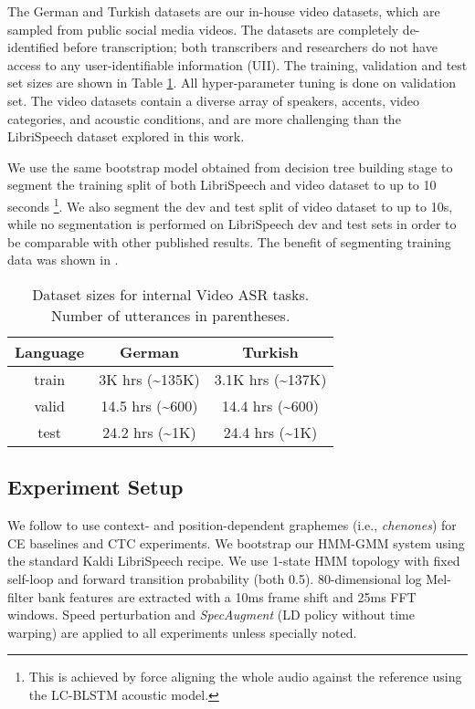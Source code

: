\documentclass[a4paper]{article}
\begin{document}
The German and Turkish datasets are our in-house video datasets, which are sampled from public social media videos. The datasets are completely de-identified before transcription; both transcribers and researchers do not have access to any user-identifiable information (UII). The training, validation and test set sizes are shown in Table \ref{tab:video_data}. All hyper-parameter tuning is done on validation set. The video datasets contain a diverse array of speakers, accents, video categories, and acoustic conditions, and are more challenging than the LibriSpeech dataset explored in this work.



We use the same bootstrap model obtained from decision tree building stage to segment the training split of both LibriSpeech and video dataset to up to 10 seconds \footnote{
This is achieved by force aligning the whole audio against the reference using the LC-BLSTM acoustic model. }. We also segment the dev and test split of video dataset to up to 10s, while no segmentation is performed on LibriSpeech dev and test sets in order to be comparable with other published results. The benefit of segmenting training data was shown in \cite{wang2019transformerbased}.

\begin{table}[htb]
    \centering
    \caption{Dataset sizes for internal Video ASR tasks. Number of utterances in parentheses.}
    \begin{tabular}{*3c}
    \hline
    Language & German & Turkish \\
    \hline\hline
    train & 3K hrs (\textasciitilde 135K) & 3.1K hrs (\textasciitilde 137K) \\
    valid & 14.5 hrs (\textasciitilde 600) & 14.4 hrs (\textasciitilde 600)  \\
    test  & 24.2 hrs (\textasciitilde 1K) & 24.4 hrs (\textasciitilde 1K)  \\
    \hline
    \end{tabular}
    \label{tab:video_data}
\end{table}
\vspace{-1em}

\subsection{Experiment Setup}

We follow \cite{le2019senones,wang2019transformerbased} to use context- and position-dependent graphemes (i.e., \textit{chenones}) for CE baselines and CTC experiments. We bootstrap our HMM-GMM system using the standard Kaldi \cite{Povey_ASRU2011} LibriSpeech recipe. We use 1-state HMM topology with fixed self-loop and forward transition probability (both 0.5). 80-dimensional log Mel-filter bank features are extracted with a 10ms frame shift and 25ms FFT windows. Speed perturbation and \emph{SpecAugment} \cite{park2019specaugment} (LD policy without time warping) are applied to all experiments unless specially noted.
\end{document}
